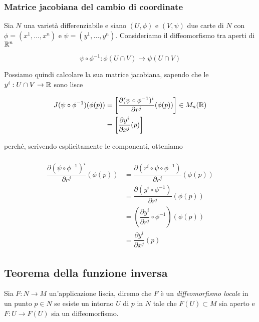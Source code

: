 \subsubsection{Matrice jacobiana del cambio di coordinate}

Sia $ N $ una varietà differenziabile e siano $ (U,\phi) $ e $ (V,\psi) $ due carte di $ N $ con $ \phi = (x^{1},\dots,x^{n}) $ e $ \psi = (y^{1},\dots,y^{n}) $. Consideriamo il diffeomorfismo tra aperti di $ \mathbb{R}^{n} $

\begin{equation}
	\psi \circ \phi^{-1} : \phi(U \cap V) \to \psi(U \cap V)
\end{equation}

Possiamo quindi calcolare la sua matrice jacobiana, sapendo che le $ y^{i} : U \cap V \to \mathbb{R} $ sono lisce

\begin{align}
	\begin{split}
		J(\psi \circ \phi^{-1})(\phi(p)) &= \left[ \dfrac{\partial (\psi \circ \phi^{-1})^{i}}{\partial r^{j}} (\phi(p)) \right] \in M_{n}(\mathbb{R})\\
		&= \left[ \dfrac{\partial y^{i}}{\partial x^{j}} (p) \right]
	\end{split}
\end{align}

perché, scrivendo esplicitamente le componenti, otteniamo

\begin{align}
	\begin{split}
		\dfrac{\partial (\psi \circ \phi^{-1})^{i}}{\partial r^{j}} (\phi(p)) &= \dfrac{\partial (r^{i} \circ \psi \circ \phi^{-1})}{\partial r^{j}} (\phi(p))\\
		&= \dfrac{\partial (y^{i} \circ \phi^{-1})}{\partial r^{j}} (\phi(p))\\
		&= \left( \dfrac{\partial y^{i}}{\partial r^{j}} \circ \phi^{-1} \right) (\phi(p))\\
		&= \dfrac{\partial y^{i}}{\partial x^{j}} (p)
	\end{split}
\end{align}

\subsection{Teorema della funzione inversa}

Sia $ F : N \to M $ un'applicazione liscia, diremo che $ F $ è un \textit{diffeomorfismo locale} in un punto $ p \in N $ se esiste un intorno $ U $ di $ p $ in $ N $ tale che $ F(U) \subset M $ sia aperto e $ F : U \to F(U) $ sia un diffeomorfismo.

